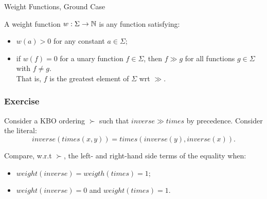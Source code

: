 \begin{frame}{Weight Functions, Ground Case}

    A \alert{weight function} ${w: \Sigma \rightarrow \mathbb{N}}$
    is any function satisfying:

    \begin{itemize}
    \item $w(a)>0$ for any constant $a\in\Sigma$;\\[.5em]
      
    \item<2-> if $w(f)=0$ for a unary function $f\in\Sigma$, then $f\gg g$
      for all functions $g\in\Sigma$ with $f\neq g$.\\

      That is, $f$ is the greatest element of $\Sigma$ wrt $\gg$.
      
     \end{itemize}

     \bigskip
{}


\end{frame}



%

      \begin{frame}\frametitle{Exercise}

Consider a KBO ordering $\succ$ such that 
$inverse\gg times$ by precedence. 
Consider the literal: 
\[
  inverse(times(x,y) ) = times(inverse(y), inverse( x )).\]

Compare, w.r.t $\succ$, the left- and right-hand side terms of the
equality when: 

\begin{itemize}
\item $weight(inverse)=weigth(times)=1$;\bigskip\\[2em]


\item $weight(inverse) = 0$ and $weight(times) = 1$.

\end{itemize}

\end{frame}




%

